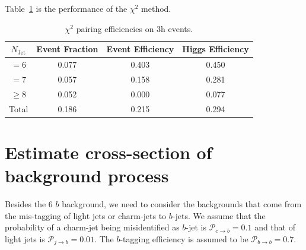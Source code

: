 \documentclass[12pt]{article}
\begin{document}
    Table~\ref{tab:chi2_pairing_triHiggs_0b} is the performance of the $\chi^2$ method.
    \begin{table}[htpb]
        \centering
        \caption{$\chi^2$ pairing efficiencies on 3h events.}
        \label{tab:chi2_pairing_triHiggs_0b}
        \begin{tabular}{c|c|cc}
            $N_\text{Jet}$ & Event Fraction & Event Efficiency & Higgs Efficiency \\
            \hline
            $=6$      &   0.077             &    0.403              &    0.450             \\
            $=7$      &   0.057             &    0.158              &    0.281             \\
            $\ge 8$   &   0.052             &    0.000              &    0.077             \\
            Total     &   0.186             &    0.215              &    0.294
        \end{tabular}
    \end{table}
\section{Estimate cross-section of background process}%
\label{sec:estimate_cross_section_of_background_process}
    Besides the 6 $b$ background, we need to consider the backgrounds that come from the mis-tagging of light jets or charm-jets to $b$-jets. We assume that the probability of a charm-jet being misidentified as $b$-jet is $\mathcal{P}_{c\to b} = 0.1$ and that of light jets is $\mathcal{P}_{j\to b} = 0.01$. The $b$-tagging efficiency is assumed to be $\mathcal{P}_{b\to b} = 0.7$.
\end{document}
